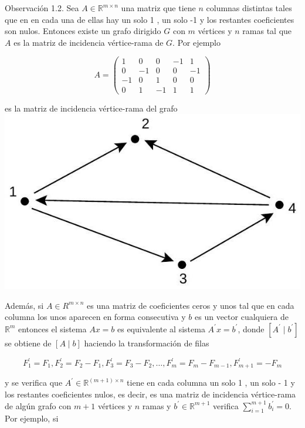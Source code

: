 \documentclass[10pt]{article}
\begin{document}
Observación 1.2. Sea $A \in \mathbb{R}^{m \times n}$ una matriz que tiene $n$ columnas distintas tales que en en cada una de ellas hay un solo 1 , un solo -1 y los restantes coeficientes son nulos. Entonces existe un grafo dirigido $G$ con $m$ vértices y $n$ ramas tal que $A$ es la matriz de incidencia vértice-rama de $G$. Por ejemplo

$$
A=\left(\begin{array}{ccccc}
1 & 0 & 0 & -1 & 1 \\
0 & -1 & 0 & 0 & -1 \\
-1 & 0 & 1 & 0 & 0 \\
0 & 1 & -1 & 1 & 1
\end{array}\right)
$$

es la matriz de incidencia vértice-rama del grafo\\
\includegraphics[max width=\textwidth, center]{2025_09_05_955b52bfc43174a24a9ag-03}

Además, si $A \in R^{m \times n}$ es una matriz de coeficientes ceros y unos tal que en cada columna los unos aparecen en forma consecutiva y $b$ es un vector cualquiera de $\mathbb{R}^{m}$ entonces el sistema $A x=b$ es equivalente al sistema $A^{\prime} x=b^{\prime}$, donde $\left[A^{\prime} \mid b^{\prime}\right]$ se obtiene de $[A \mid b]$ haciendo la transformación de filas

$$
F_{1}^{\prime}=F_{1}, F_{2}^{\prime}=F_{2}-F_{1}, F_{3}^{\prime}=F_{3}-F_{2}, \ldots, F_{m}^{\prime}=F_{m}-F_{m-1}, F_{m+1}^{\prime}=-F_{m}
$$

y se verifica que $A^{\prime} \in \mathbb{R}^{(m+1) \times n}$ tiene en cada columna un solo 1 , un solo - 1 y los restantes coeficientes nulos, es decir, es una matriz de incidencia vértice-rama de algún grafo con $m+1$ vértices y $n$ ramas y $b^{\prime} \in \mathbb{R}^{m+1}$ verifica $\sum_{i=1}^{m+1} b_{i}^{\prime}=0$. Por ejemplo, si
\end{document}

